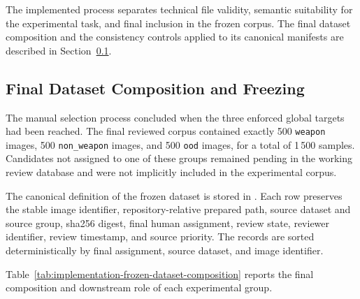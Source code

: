 The implemented process separates technical file validity, semantic suitability
for the experimental task, and final inclusion in the frozen corpus. The final
dataset composition and the consistency controls applied to its canonical
manifests are described in
Section~\ref{subsec:implementation-dataset-freezing}.

\subsection{Final Dataset Composition and Freezing}
\label{subsec:implementation-dataset-freezing}

The manual selection process concluded when the three enforced global targets
had been reached. The final reviewed corpus contained exactly 500
\texttt{weapon} images, 500 \texttt{non\_weapon} images, and 500
\texttt{ood} images, for a total of 1\,500 samples. Candidates not assigned to
one of these groups remained pending in the working review database and were
not implicitly included in the experimental corpus.

The canonical definition of the frozen dataset is stored in
. Each row
preserves the stable image identifier, repository-relative prepared path,
source dataset and source group, \gls{sha256} digest, final human assignment,
review state, reviewer identifier, review timestamp, and source priority. The
records are sorted deterministically by final assignment, source dataset, and
image identifier.

Table~\ref{tab:implementation-frozen-dataset-composition} reports the final
composition and downstream role of each experimental group.

